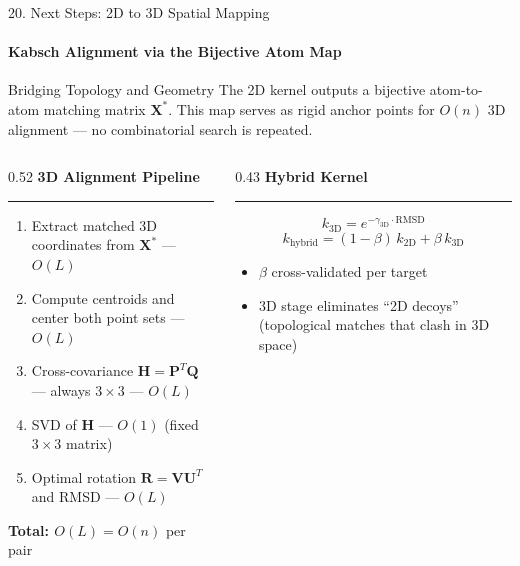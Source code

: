 \documentclass[aspectratio=169, 11pt]{beamer}
\begin{document}
\begin{frame}{20. Next Steps: 2D to 3D Spatial Mapping}
\framesubtitle{Kabsch Alignment via the Bijective Atom Map}

\begin{block}{Bridging Topology and Geometry}
The 2D kernel outputs a bijective atom-to-atom matching matrix $\mathbf{X}^*$. This map serves as rigid anchor points for $O(n)$ 3D alignment --- no combinatorial search is repeated.
\end{block}

\vspace{0.3em}

\begin{columns}[T]
    \begin{column}{0.52\textwidth}
        \textbf{3D Alignment Pipeline}
        \vspace{0.2em}\hrule\vspace{0.3em}
        \small
        \begin{enumerate}
            \setlength\itemsep{0.3em}
            \item Extract matched 3D coordinates from $\mathbf{X}^*$ --- $O(L)$
            \item Compute centroids and center both point sets --- $O(L)$
            \item Cross-covariance $\mathbf{H} = \mathbf{P}^T\mathbf{Q}$ --- always $3{\times}3$ --- $O(L)$
            \item SVD of $\mathbf{H}$ --- $O(1)$ (fixed $3{\times}3$ matrix)
            \item Optimal rotation $\mathbf{R} = \mathbf{V}\mathbf{U}^T$ and RMSD --- $O(L)$
        \end{enumerate}
        \vspace{0.3em}
        \textbf{Total: $O(L) = O(n)$} per pair
    \end{column}

    \hfill\vrule\hfill

    \begin{column}{0.43\textwidth}
        \textbf{Hybrid Kernel}
        \vspace{0.2em}\hrule\vspace{0.3em}
        \small
        \[
            k_{\text{3D}} = e^{-\gamma_{\text{3D}} \cdot \text{RMSD}}
        \]
        \[
            k_{\text{hybrid}} = (1{-}\beta)\,k_{\text{2D}} + \beta\,k_{\text{3D}}
        \]
        \begin{itemize}
            \setlength\itemsep{0.3em}
            \item $\beta$ cross-validated per target
            \item 3D stage eliminates ``2D decoys'' (topological matches that clash in 3D space)
        \end{itemize}
    \end{column}
\end{columns}

\end{frame}
\end{document}
